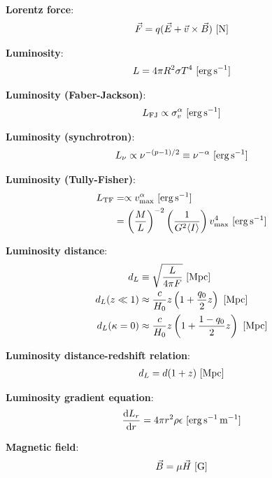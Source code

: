 \documentclass[a4paper,10pt]{article}
\begin{document}
{\noindent}\textbf{Lorentz force}:
\begin{align*}
    \vec{F} = q(\vec{E}+\vec{v}\times\vec{B}) ~ [{\rm N}]
\end{align*}

{\noindent}\textbf{Luminosity}:
\begin{align*}
    L=4\pi R^2\sigma T^4 ~ [{\rm erg\,s^{-1}}]
\end{align*}

{\noindent}\textbf{Luminosity (Faber-Jackson)}:
\begin{align*}
    L_\mathrm{FJ} \propto \sigma_v^\alpha ~ [{\rm erg\,s^{-1}}]
\end{align*}

{\noindent}\textbf{Luminosity (synchrotron)}:
\begin{align*}
    L_\nu \propto \nu^{-(p-1)/2}\equiv \nu^{-\alpha} ~ [{\rm erg\,s^{-1}}]
\end{align*}

{\noindent}\textbf{Luminosity (Tully-Fisher)}:
\begin{align*}
    L_\mathrm{TF} &= \propto v_\mathrm{max}^\alpha ~ [{\rm erg\,s^{-1}}] \\
    &= \left(\frac{M}{L}\right)^{-2} \left(\frac{1}{G^2\langle I\rangle}\right)v_\mathrm{max}^4 ~ [{\rm erg\,s^{-1}}]
\end{align*}

{\noindent}\textbf{Luminosity distance}:
\begin{align*}
    d_L &\equiv \sqrt{\frac{L}{4\pi F}} ~ [{\rm Mpc}] \\
    d_L(z\ll1) &\approx \frac{c}{H_0}z\left(1+\frac{q_0}{2}z\right) ~ [{\rm Mpc}] \\
    d_L(\kappa=0) &\approx \frac{c}{H_0}z \left(1+\frac{1-q_0}{2}z\right) ~ [{\rm Mpc}]
\end{align*}

{\noindent}\textbf{Luminosity distance-redshift relation}:
\begin{align*}
    d_L = d(1+z) ~ [{\rm Mpc}]
\end{align*}

{\noindent}\textbf{Luminosity gradient equation}:
\begin{align*}
    \frac{{\rm d}L_r}{{\rm d}r} = 4\pi r^2\rho\epsilon ~ [{\rm erg\,s^{-1}\,m^{-1}}]
\end{align*}

{\noindent}\textbf{Magnetic field}:
\begin{align*}
    \vec{B} = \mu\vec{H} ~ [{\rm G}]
\end{align*}
\end{document}
